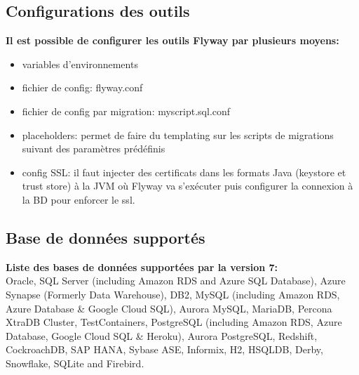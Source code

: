 \documentclass[slidestop,compress,11pt,xcolor=dvipsnames,french]{beamer}
\begin{document}
\subsection*{Configurations des outils}
\begin{frame}
\vspace{1cm}
\textbf {Il est possible de configurer les outils Flyway par plusieurs moyens: \\}
    \begin{itemize}
        \item variables d'environnements 
        \item fichier de config: flyway.conf
        \item fichier de config par migration: myscript.sql.conf 
        \item placeholders: permet de faire du templating sur les scripts de migrations suivant des paramètres prédéfinis
        \item config SSL: il faut injecter des certificats dans les formats Java (keystore et trust store) à la JVM où Flyway va s'exécuter puis configurer la connexion à la BD pour enforcer le ssl.
    \end{itemize}
\end{frame} 

\subsection*{Base de données supportés}
\begin{frame}
\vspace{0.5cm}
\textbf {Liste des bases de données supportées par la version 7: \\}
\vspace{0.5cm} 
{\footnotesize
     Oracle, SQL Server (including Amazon RDS and Azure SQL Database), Azure Synapse (Formerly Data Warehouse), DB2, MySQL (including Amazon RDS, Azure Database \& Google Cloud SQL), Aurora MySQL, MariaDB, Percona XtraDB Cluster, TestContainers, PostgreSQL (including Amazon RDS, Azure Database, Google Cloud SQL \& Heroku), Aurora PostgreSQL, Redshift, CockroachDB, SAP HANA, Sybase ASE, Informix, H2, HSQLDB, Derby, Snowflake, SQLite and Firebird.}
\end{frame}
\end{document}
